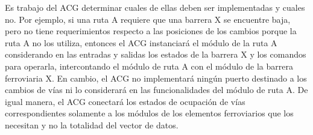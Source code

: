 Es trabajo del ACG determinar cuales de ellas deben ser implementadas y cuales no. Por ejemplo, si una ruta A requiere que una barrera X se encuentre baja, pero no tiene requerimientos respecto a las posiciones de los cambios porque la ruta A no los utiliza, entonces el ACG instanciará el módulo de la ruta A considerando en las entradas y salidas los estados de la barrera X y los comandos para operarla, intercontando el módulo de ruta A con el módulo de la barrera ferroviaria X. En cambio, el ACG no implementará ningún puerto destinado a los cambios de vías ni lo considerará en las funcionalidades del módulo de ruta A. De igual manera, el ACG conectará los estados de ocupación de vías correspondientes solamente a los módulos de los elementos ferroviarios que los necesitan y no la totalidad del vector de datos.







